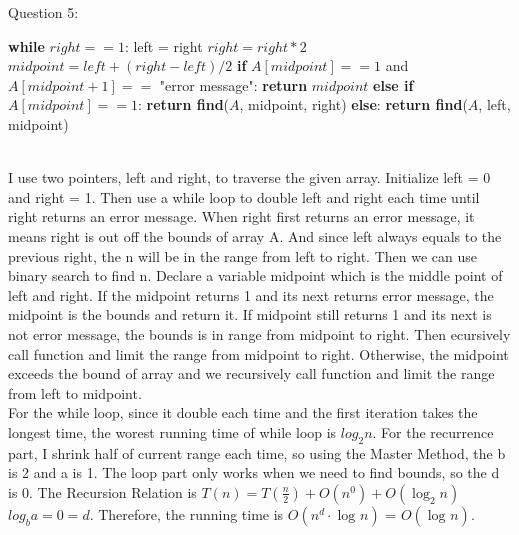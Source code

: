 \documentclass[12pt]{article}
\begin{document}
\pagebreak
\noindent
\large Question 5: \vspace{5mm}\\
\normalsize 
\begin{algorithm}
\begin{algorithmic}
    \State \textbf{while} $right == 1$:
    \State \hspace{0.8cm}  left = right
    \State \hspace{0.8cm}  $right = right * 2$
    \State \textbf{}$midpoint = left + (right - left) / 2$
    \State \textbf{if} $A[midpoint] == 1$ and $A[midpoint + 1] == $ "error message":
    \State \hspace{0.8cm}  \textbf{return} $midpoint$
    \State \textbf{else if} $A[midpoint] == 1$:
    \State \hspace{0.8cm}  \textbf{return find}($A$, midpoint, right)
    \State \textbf{else}:
    \State \hspace{0.8cm}  \textbf{return find}($A$, left, midpoint)
\EndFunction
\end{algorithmic}
\end{algorithm}\vspace{3mm}\\
I use two pointers, left and right, to traverse the given array. Initialize left = 0 and right = 1. Then use a while loop to double left and right each time until right returns an error message. When right first returns an error message, it means right is out off the bounds of array A. And since left always equals to the previous right, the n will be in the range from left to right. Then we can use binary search to find n. Declare a variable midpoint which is the middle point of left and right. If the midpoint returns 1 and its next returns error message, the midpoint is the bounds and return it. If midpoint still returns 1 and its next is not error message, the bounds is in range from midpoint to right. Then ecursively call function and limit the range from midpoint to right. Otherwise, the midpoint exceeds the bound of array and we recursively call function and limit the range from left to midpoint. \vspace{5mm}\\
For the while loop, since it double each time and the first iteration takes the longest time, the worest running time of while loop is $log_2{n}$. For the recurrence part, I shrink half of current range each time, so using the Master Method, the b is 2 and a is 1. The loop part only works when we need to find bounds, so the d is 0. The Recursion Relation is $T(n) = T(\frac{n}{2}) + O(n^0) + O(\log_{2}{n})$ $log_b{a} = 0 = d$. Therefore, the running time is $O(n^d\cdot \log_{}{n})$ = $O(\log_{}{n})$.
\end{document}
